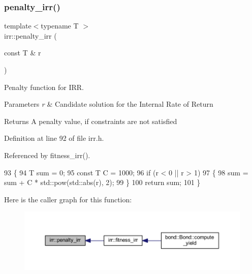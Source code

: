 \subsubsection{\texorpdfstring{penalty\+\_\+irr()}{penalty\_irr()}}
{\footnotesize\ttfamily template$<$typename T $>$ \\
irr\+::penalty\+\_\+irr (\begin{DoxyParamCaption}\item[{const T \&}]{r }\end{DoxyParamCaption})}



Penalty function for I\+RR. 


\begin{DoxyParams}{Parameters}
{\em r} & Candidate solution for the Internal Rate of Return \\
\hline
\end{DoxyParams}
\begin{DoxyReturn}{Returns}
A penalty value, if constraints are not satisfied 
\end{DoxyReturn}


Definition at line 92 of file irr.\+h.



Referenced by fitness\+\_\+irr().


\begin{DoxyCode}
93     \{
94         T sum = 0;
95         \textcolor{keyword}{const} T C = 1000;
96         \textcolor{keywordflow}{if} (r < 0 || r > 1)
97         \{
98             sum = sum + C * std::pow(std::abs(r), 2);
99         \}
100         \textcolor{keywordflow}{return} sum;
101     \}
\end{DoxyCode}
Here is the caller graph for this function\+:
\nopagebreak
\begin{figure}[H]
\begin{center}
\leavevmode
\includegraphics[width=350pt]{namespaceirr_abd1d21a84003df6b46dc32c3a30d2269_icgraph}
\end{center}
\end{figure}
